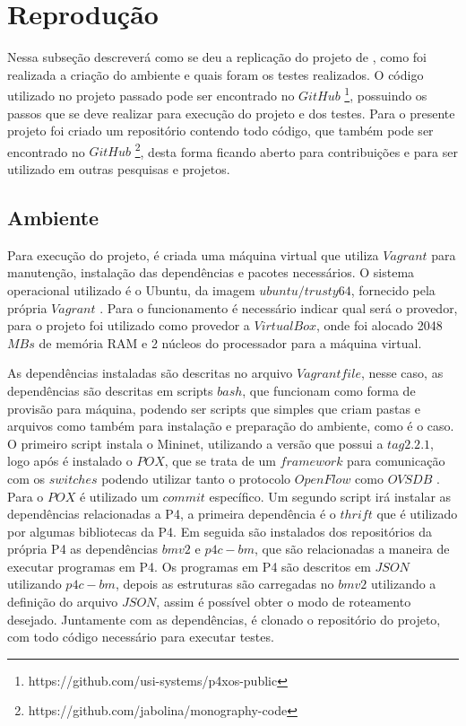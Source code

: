 \documentclass[
    12pt,
    openright, 
    oneside,
    a4paper,
    french,
    english,
    brazil
    ]{facom-ufu-abntex2}
\theoremstyle{definition}
\begin{document}
\section{Reprodução}
Nessa subseção descreverá como se deu a replicação do projeto de \cite{dang2016paxos}, como foi realizada 
a criação do ambiente e quais foram os testes
realizados. O código utilizado no projeto passado pode ser encontrado no $GitHub$
\footnote{https://github.com/usi-systems/p4xos-public}, possuindo os passos que
se deve realizar para execução do projeto e dos testes. Para o presente projeto foi 
criado um repositório contendo todo código, que também pode ser encontrado no $GitHub$
\footnote{https://github.com/jabolina/monography-code}, desta forma ficando aberto
para contribuições e para ser utilizado em outras pesquisas e projetos.

\subsection{Ambiente}
Para execução do projeto, é criada uma máquina virtual que utiliza $Vagrant$ para
manutenção, instalação das dependências e pacotes necessários. O sistema operacional
utilizado é o Ubuntu, da imagem $ubuntu/trusty64$, fornecido pela própria
$Vagrant$ \cite{ubuntuTrusty}. Para o funcionamento é necessário indicar qual será
o provedor, para o projeto foi utilizado como provedor a $VirtualBox$, onde foi
alocado 2048 $MBs$ de memória RAM e 2 núcleos do processador para a máquina
virtual.

As dependências instaladas são descritas no arquivo $Vagrantfile$, nesse caso,
as dependências são descritas em scripts $bash$, que funcionam como forma
de provisão para máquina, podendo ser scripts que simples que criam pastas e arquivos
como também para instalação e preparação do ambiente, como é o caso. O primeiro script 
instala o Mininet, utilizando a versão que possui a $tag 2.2.1$, logo após é instalado 
o $POX$, que se trata de um $framework$ para comunicação com os $switches$ podendo 
utilizar tanto o protocolo $OpenFlow$  como $OVSDB$ \cite{poxWiki}. Para o $POX$ 
é utilizado um $commit$ específico. Um segundo script irá instalar as dependências 
relacionadas a P4, a primeira dependência é o $thrift$ que é utilizado por
algumas bibliotecas da P4. Em seguida são instalados dos repositórios da própria P4
as dependências $bmv2$ e $p4c-bm$, que são relacionadas a maneira de executar programas em P4.
Os programas em P4 são descritos em $JSON$ utilizando $p4c-bm$, depois as estruturas são 
carregadas no $bmv2$ utilizando a definição do arquivo $JSON$, assim é possível obter o modo
de roteamento desejado. Juntamente com as dependências, é clonado o repositório do projeto, 
com todo código necessário para executar testes.
\end{document}
